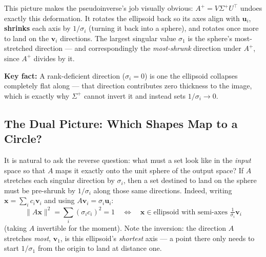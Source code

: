 \documentclass[12pt, a4paper]{article}
\theoremstyle{definition}
\begin{document}
This picture makes the pseudoinverse's job visually obvious: $A^+ = V\Sigma^+U^\top$ undoes exactly this deformation. It rotates the ellipsoid back so its axes align with $\mathbf{u}_i$, \textbf{shrinks} each axis by $1/\sigma_i$ (turning it back into a sphere), and rotates once more to land on the $\mathbf{v}_i$ directions. The largest singular value $\sigma_1$ is the sphere's most-stretched direction — and correspondingly the \emph{most-shrunk} direction under $A^+$, since $A^+$ divides by it.

\begin{keybox}
\textbf{Key fact:} A rank-deficient direction ($\sigma_i = 0$) is one the ellipsoid collapses completely flat along — that direction contributes zero thickness to the image, which is exactly why $\Sigma^+$ cannot invert it and instead sets $1/\sigma_i \to 0$.
\end{keybox}

\subsection{The Dual Picture: Which Shapes Map to a Circle?}

It is natural to ask the reverse question: what must a set look like in the \emph{input} space so that $A$ maps it exactly onto the unit sphere of the output space? If $A$ stretches each singular direction by $\sigma_i$, then a set destined to land on the sphere must be pre-shrunk by $1/\sigma_i$ along those same directions. Indeed, writing $\mathbf{x} = \sum_i c_i \mathbf{v}_i$ and using $A\mathbf{v}_i = \sigma_i\mathbf{u}_i$:
\[
    \|A\mathbf{x}\|^2 = \sum_i (\sigma_i c_i)^2 = 1
    \quad\Longleftrightarrow\quad
    \mathbf{x} \in \text{ellipsoid with semi-axes } \tfrac{1}{\sigma_i}\mathbf{v}_i
\]
(taking $A$ invertible for the moment). Note the inversion: the direction $A$ stretches \emph{most}, $\mathbf{v}_1$, is this ellipsoid's \emph{shortest} axis — a point there only needs to start $1/\sigma_1$ from the origin to land at distance one.
\end{document}
